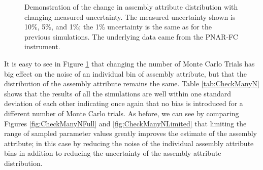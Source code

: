 \documentclass{ansnse}
\begin{document}
\begin{figure}[hp!]\centering
     \qquad
    \caption{Demonstration of the change in assembly attribute distribution with changing measured uncertainty.  The measured uncertainty shown is 10\%, 5\%, and 1\%; the 1\% uncertainty is the same as for the previous simulations.  The underlying data came from the PNAR-FC instrument.}
    \label{fig:CheckManyN}
\end{figure}

It is easy to see in Figure \ref{fig:CheckManyN} that changing the number of Monte Carlo Trials has big effect on the noise of an individual bin of assembly attribute, but that the distribution of the assembly attribute remains the same.  Table \ref{tab:CheckManyN} shows that the results of all the simulations are well within one standard deviation of each other indicating once again that no bias is introduced for a different number of Monte Carlo trials.  As before, we can see by comparing Figures \ref{fig:CheckManyNFull} and \ref{fig:CheckManyNLimited} that limiting the range of sampled parameter values greatly improves the estimate of the assembly attribute; in this case by reducing the noise of the individual assembly attribute bins in addition to reducing the uncertainty of the assembly attribute distribution.
    
\end{document}
